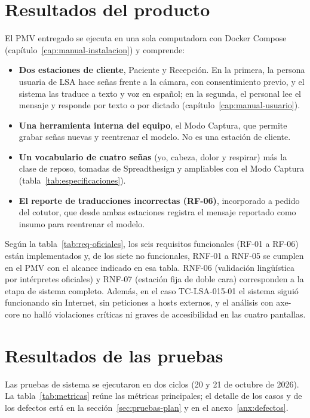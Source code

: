 \section{Resultados del producto}\label{sec:res-producto}

El PMV entregado se ejecuta en una sola computadora con Docker Compose (capítulo~\ref{cap:manual-instalacion}) y comprende:
\begin{itemize}
  \item \textbf{Dos estaciones de cliente}, Paciente y Recepción. En la primera, la persona usuaria de LSA hace señas frente a la cámara, con consentimiento previo, y el sistema las traduce a texto y voz en español; en la segunda, el personal lee el mensaje y responde por texto o por dictado (capítulo~\ref{cap:manual-usuario}).
  \item \textbf{Una herramienta interna del equipo}, el Modo Captura, que permite grabar señas nuevas y reentrenar el modelo. No es una estación de cliente.
  \item \textbf{Un vocabulario de cuatro señas} (yo, cabeza, dolor y respirar) más la clase de reposo, tomadas de Spreadthesign y ampliables con el Modo Captura (tabla~\ref{tab:especificaciones}).
  \item \textbf{El reporte de traducciones incorrectas (RF-06)}, incorporado a pedido del cotutor, que desde ambas estaciones registra el mensaje reportado como insumo para reentrenar el modelo.
\end{itemize}

Según la tabla~\ref{tab:req-oficiales}, los seis requisitos funcionales (RF-01 a RF-06) están implementados y, de los siete no funcionales, RNF-01 a RNF-05 se cumplen en el PMV con el alcance indicado en esa tabla. RNF-06 (validación lingüística por intérpretes oficiales) y RNF-07 (estación fija de doble cara) corresponden a la etapa de sistema completo. Además, en el caso TC-LSA-015-01 el sistema siguió funcionando sin Internet, sin peticiones a hosts externos, y el análisis con axe-core no halló violaciones críticas ni graves de accesibilidad en las cuatro pantallas.

\section{Resultados de las pruebas}\label{sec:res-pruebas}

Las pruebas de sistema se ejecutaron en dos ciclos (20 y 21 de octubre de 2026). La tabla~\ref{tab:metricas} reúne las métricas principales; el detalle de los casos y de los defectos está en la sección~\ref{sec:pruebas-plan} y en el anexo~\ref{anx:defectos}.

